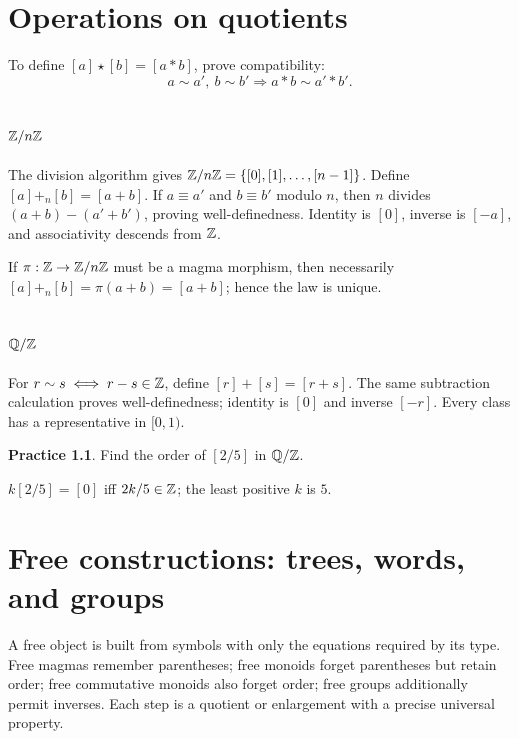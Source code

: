 \documentclass[11pt,openany]{book}
\newcommand{\Q}{\mathbb Q}\newcommand{\R}{\mathbb R}
\theoremstyle{definition}
\newtheorem{exercise}[theorem]{Practice}
\begin{document}
\chapter{Operations on quotients}
To define $[a]\star[b]=[a*b]$, prove compatibility:
\[
a\sim a',\ b\sim b'\Longrightarrow a*b\sim a'*b'.
\]
\section{$\mathbb Z/n\mathbb Z$}
The division algorithm gives
$\mathbb Z/n\mathbb Z=\{[0],[1],\ldots,[n-1]\}$. Define $[a]+_n[b]=[a+b]$. If $a\equiv a'$ and $b\equiv b'$ modulo $n$, then $n$ divides $(a+b)-(a'+b')$, proving well-definedness. Identity is $[0]$, inverse is $[-a]$, and associativity descends from $\mathbb Z$.

If $\pi:\mathbb Z\to\mathbb Z/n\mathbb Z$ must be a magma morphism, then necessarily
$[a]+_n[b]=\pi(a+b)=[a+b]$; hence the law is unique.

\section{$\Q/\Z$}
For $r\sim s\iff r-s\in\mathbb Z$, define $[r]+[s]=[r+s]$. The same subtraction calculation proves well-definedness; identity is $[0]$ and inverse $[-r]$. Every class has a representative in $[0,1)$.
\begin{exercise}Find the order of $[2/5]$ in $\Q/\Z$.\end{exercise}
\begin{solution}$k[2/5]=[0]$ iff $2k/5\in\mathbb Z$; the least positive $k$ is $5$.\end{solution}


\chapter{Free constructions: trees, words, and groups}
\begin{intuition}A free object is built from symbols with only the equations required by its type. Free magmas remember parentheses; free monoids forget parentheses but retain order; free commutative monoids also forget order; free groups additionally permit inverses. Each step is a quotient or enlargement with a precise universal property.\end{intuition}
\end{document}
